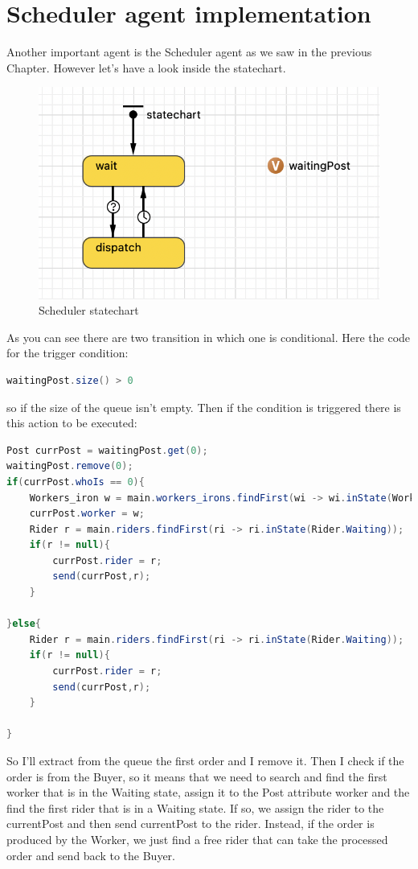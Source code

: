 \section{Scheduler agent implementation}
Another important agent is the Scheduler agent as we saw in the previous Chapter. However let's have a look inside the statechart.
\begin{figure}[hbtp]
\caption{Scheduler statechart}
\centering
\includegraphics[scale=0.6]{../Images/schedulerstatechart.png}
\end{figure}
As you can see there are two transition in which one is conditional. Here the code for the trigger condition:
\begin{lstlisting}[language=Java]
waitingPost.size() > 0
\end{lstlisting}
so if the size of the queue isn't empty. Then if the condition is triggered there is this action to be executed:
\begin{lstlisting}[language=Java]
Post currPost = waitingPost.get(0);
waitingPost.remove(0);
if(currPost.whoIs == 0){
	Workers_iron w = main.workers_irons.findFirst(wi -> wi.inState(Workers_iron.Waiting));
	currPost.worker = w;
	Rider r = main.riders.findFirst(ri -> ri.inState(Rider.Waiting));
	if(r != null){
		currPost.rider = r;
		send(currPost,r);
	}
	
}else{
	Rider r = main.riders.findFirst(ri -> ri.inState(Rider.Waiting));
	if(r != null){
		currPost.rider = r;
		send(currPost,r);
	}
	
}
\end{lstlisting}
So I'll extract from the queue the first order and I remove it. Then I check if the order is from the Buyer, so it means that we need to search and find the first worker that is in the Waiting state, assign it to the Post attribute worker and the find the first rider that is in a Waiting state. If so, we assign the rider to the currentPost and then send currentPost to the rider. Instead, if the order is produced by the Worker, we just find a free rider that can take the processed order and send back to the Buyer. 
